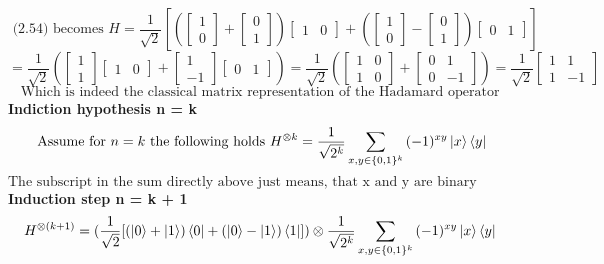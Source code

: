 \documentclass{article}
\begin{document}
\begin{framed}
    $$\text{ (2.54) becomes } H = \frac{1}{\sqrt{2}}[(\begin{bmatrix}1 \\ 0\end{bmatrix} + \begin{bmatrix}0 \\ 1\end{bmatrix})\begin{bmatrix}1 & 0\end{bmatrix} + (\begin{bmatrix}1 \\ 0\end{bmatrix} - \begin{bmatrix}0 \\ 1\end{bmatrix})\begin{bmatrix}0 & 1\end{bmatrix}]
    $$
    $$
    = \frac{1}{\sqrt2}(\begin{bmatrix}1 \\ 1\end{bmatrix}\begin{bmatrix}1 & 0\end{bmatrix} + \begin{bmatrix}1 \\ -1\end{bmatrix}\begin{bmatrix}0 & 1\end{bmatrix}) = \frac{1}{\sqrt{2}}(\begin{bmatrix}1 & 0 \\ 1 & 0\end{bmatrix}+\begin{bmatrix} 0 & 1 \\ 0 & -1\end{bmatrix}) = \frac{1}{\sqrt{2}}\begin{bmatrix}1 & 1 \\ 1 & -1\end{bmatrix}
    $$
    $$
    \text{Which is indeed the classical matrix representation of the Hadamard operator}
    $$
    \textbf{Indiction hypothesis n = k}
    $$
    \text{ Assume for } n = k \text{ the following holds } H^{\otimes k} = \frac{1}{\sqrt{2^k}}\sum_{x,y\in \{0,1\}^k}{(-1)^{xy}\ket{x}\bra{y}}
    $$
    $$
    \text{The subscript in the sum directly above just means, that x and y are binary strings of length k}
    $$
    \textbf{Induction step n = k + 1}
    $$
    H^{\otimes (k+1)} = (\frac{1}{\sqrt{2}}[(\ket{0}+\ket{1})\bra{0} + (\ket{0}-\ket{1})\bra{1}]) \otimes \frac{1}{\sqrt{2^k}}\sum_{x,y\in \{0,1\}^k}{(-1)^{xy}\ket{x}\bra{y}}
$$
\end{framed}
\end{document}
